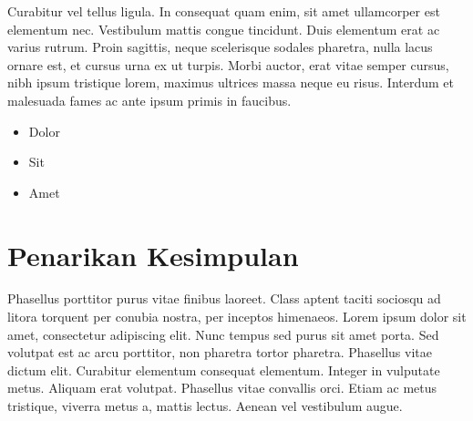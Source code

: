 Curabitur vel tellus ligula. In consequat quam enim, sit amet
ullamcorper est elementum nec. Vestibulum mattis congue
tincidunt. Duis elementum erat ac varius rutrum. Proin sagittis, neque
scelerisque sodales pharetra, nulla lacus ornare est, et cursus urna
ex ut turpis. Morbi auctor, erat vitae semper cursus, nibh ipsum
tristique lorem, maximus ultrices massa neque eu risus. Interdum et
malesuada fames ac ante ipsum primis in faucibus.

\begin{itemize}
\item Dolor
\item Sit
\item Amet
\end{itemize}


\section{Penarikan Kesimpulan}
\label{subsec:label}

Phasellus porttitor purus \textcite{warn} vitae finibus laoreet. Class
aptent taciti sociosqu ad litora torquent per conubia nostra, per
inceptos himenaeos. Lorem ipsum dolor sit amet, consectetur adipiscing
elit. Nunc tempus sed purus sit amet porta. Sed volutpat est ac arcu
porttitor, non pharetra tortor pharetra. Phasellus vitae dictum
elit. Curabitur elementum consequat elementum. Integer in vulputate
metus. Aliquam erat volutpat. Phasellus vitae convallis orci. Etiam ac
metus tristique, viverra metus a, mattis lectus. Aenean vel vestibulum
augue.

